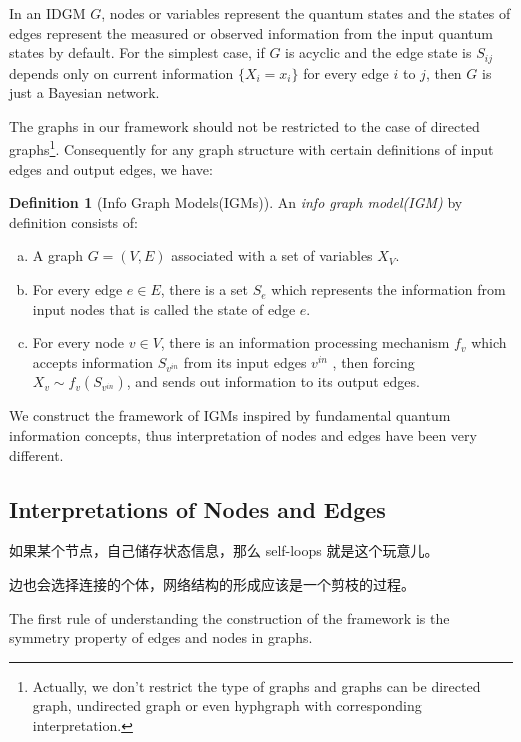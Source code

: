 \documentclass{article}
\theoremstyle{definition}
\newtheorem{definition}{Definition}[section]
\theoremstyle{remark}
\theoremstyle{definition}
\begin{document}
\begin{CJK*}{UTF8}{gbsn}
In an IDGM $G$, nodes or variables  represent the quantum states and the states of edges represent the measured or observed information from the input quantum states by default.  For the simplest case, if $G$ is acyclic and the edge state is $S_{ij}$ depends only on current information $\{X_i = x_i\}$ for every edge $i$ to $j$, then $G$ is just a Bayesian network. 




The graphs in our framework should not be restricted to the case of directed graphs\footnote{Actually, we don't restrict the type of graphs and graphs can be directed graph, undirected graph or even hyphgraph with corresponding interpretation.}. Consequently for any graph structure with certain definitions of input edges and output edges, we have:

\begin{definition}[Info Graph Models(IGMs)]
    An \emph{info graph model(IGM)} by definition consists of:
    \begin{enumerate}[a)]
        \item  A graph $G = (V, E)$ associated with a set of variables $X_V$. 
        \item  For every edge $e \in E$, there is a set $S_e$ which represents the  information from input nodes that is called the state of edge $e$. 
        \item  For every node $v \in V$, there is an information processing mechanism $f_v$ which accepts information $S_{v^{in}}$ from its input edges ${v^{in}}$ , then forcing $X_v \sim f_v(S_{v^{in}})$, and sends out information to its output edges. 
    \end{enumerate}  
\end{definition}

We construct the framework of IGMs inspired by fundamental quantum information concepts, thus interpretation of nodes and edges have been very different.

\subsection{Interpretations of Nodes and Edges}

如果某个节点，自己储存状态信息，那么 self-loops 就是这个玩意儿。

边也会选择连接的个体，网络结构的形成应该是一个剪枝的过程。

The first rule of understanding the construction of the framework is the symmetry property of edges and nodes in graphs.


\end{CJK*}
\end{document}
